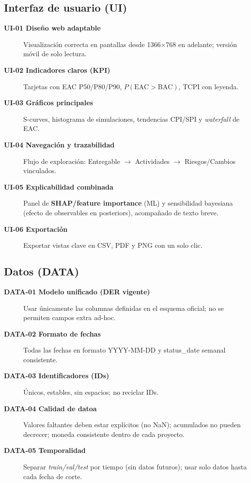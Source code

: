 \documentclass[12pt]
{charter}
\begin{document}
\subsection{Interfaz de usuario (UI)}
\begin{description}
  \item[\textbf{UI-01 Diseño web adaptable}] Visualización correcta en pantallas desde 1366$\times$768 en adelante; versión móvil de solo lectura.

  \item[\textbf{UI-02 Indicadores claros (KPI)}] Tarjetas con EAC P50/P80/P90, $P(\text{EAC}>\text{BAC})$, TCPI con leyenda.

  \item[\textbf{UI-03 Gráficos principales}] S-curves, histograma de simulaciones, tendencias CPI/SPI y \textit{waterfall} de EAC.

  \item[\textbf{UI-04 Navegación y trazabilidad}] Flujo de exploración: Entregable $\rightarrow$ Actividades $\rightarrow$ Riesgos/Cambios vinculados.

  \item[\textbf{UI-05 Explicabilidad combinada}] Panel de \textbf{SHAP/feature importance} (ML) y sensibilidad bayesiana (efecto de observables en posteriors), acompañado de texto breve.

   \item[\textbf{UI-06 Exportación}] Exportar vistas clave en CSV, PDF y PNG con un solo clic.

\end{description}

\subsection{Datos (DATA)}
\begin{description}
  \item[\textbf{DATA-01 Modelo unificado (DER vigente)}] Usar únicamente las columnas definidas en el esquema oficial; no se permiten campos extra ad-hoc.

  \item[\textbf{DATA-02 Formato de fechas}] Todas las fechas en formato YYYY-MM-DD y status\_date semanal consistente.

  \item[\textbf{DATA-03 Identificadores (IDs)}] Únicos, estables, sin espacios; no reciclar IDs.

  \item[\textbf{DATA-04 Calidad de datoa}] Valores faltantes deben estar explícitos (no NaN); acumulados no pueden decrecer; moneda consistente dentro de cada proyecto.

  \item[\textbf{DATA-05 Temporalidad}] Separar \textit{train/val/test} por tiempo (sin datos futuros); usar solo datos hasta cada fecha de corte.

\end{description}
\end{document}
